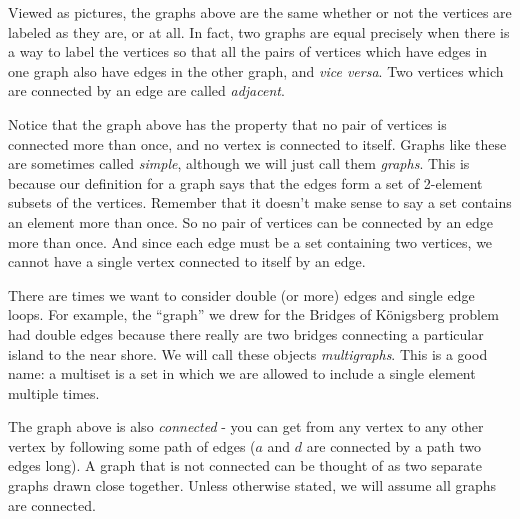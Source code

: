 \documentclass[12pt]{article}
\begin{document}
\begin{center}
  \hspace{1in}
\end{center}

Viewed as pictures, the graphs above are the same whether or not the vertices are labeled as they are, or at all.  In fact, two graphs are equal precisely when there is a way to label the vertices so that all the pairs of vertices which have edges in one graph also have edges in the other graph, and {\it vice versa}.  Two vertices which are connected by an edge are called {\em adjacent}.

Notice that the graph above has the property that no pair of vertices is connected more than once, and no vertex is connected to itself.  Graphs like these are sometimes called {\em simple}, although we will just call them {\em graphs}.  This is because our definition for a graph says that the edges form a set of 2-element subsets of the vertices.  Remember that it doesn't make sense to say a set contains an element more than once.  So no pair of vertices can be connected by an edge more than once.  And since each edge must be a set containing two vertices, we cannot have a single vertex connected to itself by an edge.

There are times we want to consider double (or more) edges and single edge loops.  For example, the ``graph'' we drew for the Bridges of K\"onigsberg problem had double edges because there really are two bridges connecting a particular island to the near shore.  We will call these objects {\em multigraphs}.  This is a good name: a multiset is a set in which we are allowed to include a single element multiple times.

The graph above is also {\em connected} - you can get from any vertex to any other vertex by following some path of edges ($a$ and $d$ are connected by a path two edges long).  A graph that is not connected can be thought of as two separate graphs drawn close together.  Unless otherwise stated, we will assume all graphs are connected.  
\end{document}
